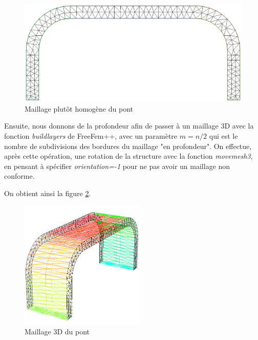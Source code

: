     \begin{figure}     
        \begin{center}
        
            \includegraphics[width=12cm]{imgs/all_maillage_pondere.PNG}
            \caption{Maillage plutôt homogène du pont}
            \label{fig:maillage_pondere}
        
        \end{center}
    \end{figure}

    Ensuite, nous donnons de la profondeur afin de passer à un maillage 3D avec la fonction \emph{buildlayers} de FreeFem++, 
    avec un paramètre $m=n/2$ qui est le nombre de subdivisions des bordures du maillage "en profondeur". On effectue, après cette opération, une rotation de la structure 
    avec la fonction \emph{movemesh3}, en pensant à spécifier \emph{orientation=-1} pour ne pas avoir un maillage non conforme.

    On obtient ainsi la figure \ref{fig:maillage_3d}.

    \begin{figure}        
        \begin{center}
        
            \includegraphics[width=6cm]{imgs/all_maillage_3d.PNG}
            \caption{Maillage 3D du pont}
            \label{fig:maillage_3d}
        
        \end{center}
    \end{figure}


